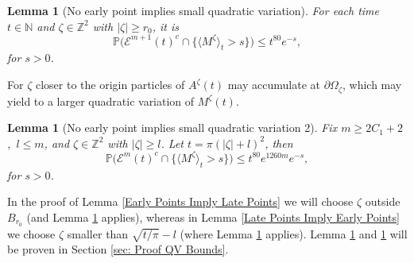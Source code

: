\documentclass[11pt]{article}
\numberwithin{equation}{section}
\def\OZ{\Omega_{\zeta}}
\newtheorem{lemma}[theorem]{Lemma}
\begin{document}
\begin{lemma}[No early point implies small quadratic variation]
  \label{no early points then smal QV}
  For each time $t \in \mathbb{N}$ and $\zeta \in \mathbb{Z}^2$ with $| \zeta | \geq r_0$, it is
  $$
    \mathbb{P} \big( \mathcal{E}^{m+1} (t)^c \cap 
    \{ \langle M^{\zeta} \rangle _t > s \} \big)
    \leq t^{80} e^{-s},
  $$
  for $s>0$.
\end{lemma}

For $\zeta$ closer to the origin particles of $A^{\zeta}(t)$ 
may accumulate at $\partial \OZ$, which may yield to a larger 
quadratic variation of $M^{\zeta}(t)$.

\begin{lemma}[No early point implies small quadratic variation 2]
  \label{No early point then small QV 2}
  Fix \hbox{$m \geq 2C_1 + 2$, $l \leq m$}, 
  and $\zeta \in \mathbb{Z}^2$ with $|\zeta| \geq l$. 
  Let $t = \pi (|\zeta| + l)^2$, then 
  $$
    \mathbb{P} \big( \mathcal{E}^{m} (t)^c \cap 
    \{ \langle M^{\zeta} \rangle _t > s \} \big)
    \leq t^{80} e^{1260m} e^{- s},
  $$
  for $s > 0$. 
\end{lemma}

In the proof of Lemma \ref{Early Points Imply Late Points}
we will choose $\zeta$ outside $B_{r_0}$ (and 
Lemma \ref{no early points then smal QV} applies), 
whereas in Lemma \ref{Late Points Imply Early Points} 
we choose $\zeta$ smaller than $\sqrt{t/\pi} - l$ 
(where Lemma \ref{No early point then small QV 2} applies).
Lemma \ref{no early points then smal QV} and \ref{No early point then small QV 2} 
will be proven in Section \ref{sec: Proof QV Bounds}.
\end{document}
